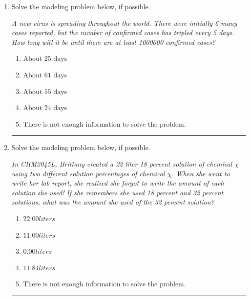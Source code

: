 \documentclass[14pt]{extbook}
\newcommand{\litem}[1]{\item#1\hspace*{-1cm}\rule{\textwidth}{0.4pt}}
\begin{document}
\begin{enumerate}
{\begin{enumerate}[label=\Alph*.]
\end{enumerate} }
\litem{
Solve the modeling problem below, if possible.
\begin{center}
    \textit{ A new virus is spreading throughout the world. There were initially 6 many cases reported, but the number of confirmed cases has tripled every 5 days. How long will it be until there are at least 1000000 confirmed cases? }
\end{center}
\begin{enumerate}[label=\Alph*.]
\item \( \text{About } 25 \text{ days} \)
\item \( \text{About } 61 \text{ days} \)
\item \( \text{About } 55 \text{ days} \)
\item \( \text{About } 24 \text{ days} \)
\item \( \text{There is not enough information to solve the problem.} \)

\end{enumerate} }
\litem{
Solve the modeling problem below, if possible.
\begin{center}
    \textit{ In CHM2045L, Brittany created a 22 liter 18 percent solution of chemical $\chi$ using two different solution percentages of chemical $\chi$. When she went to write her lab report, she realized she forgot to write the amount of each solution she used! If she remembers she used 18 percent and 32 percent solutions, what was the amount she used of the 32 percent solution? }
\end{center}
\begin{enumerate}[label=\Alph*.]
\item \( 22.00 liters \)
\item \( 11.00 liters \)
\item \( 0.00 liters \)
\item \( 11.84 liters \)
\item \( \text{There is not enough information to solve the problem.} \)


\end{enumerate}}
\end{enumerate}
\end{document}
